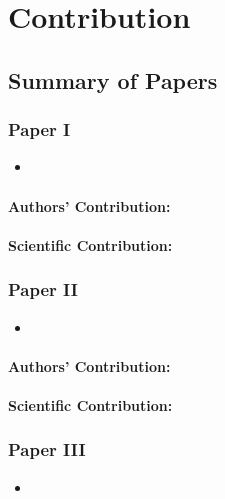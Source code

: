 \chapter{Contribution}



\section{Summary of Papers}%
%
\subsection*{Paper I}%
%
\begin{itemize}
    \item[] 
\end{itemize}

\subsubsection*{Authors' Contribution:}%
%
\subsubsection*{Scientific Contribution:}%
%

\subsection*{Paper II}%
%
\begin{itemize}
    \item[] 
\end{itemize}

\subsubsection*{Authors' Contribution:}%
%
\subsubsection*{Scientific Contribution:}%
%

\subsection*{Paper III}%
%
\begin{itemize}
    \item[] 
\end{itemize}

